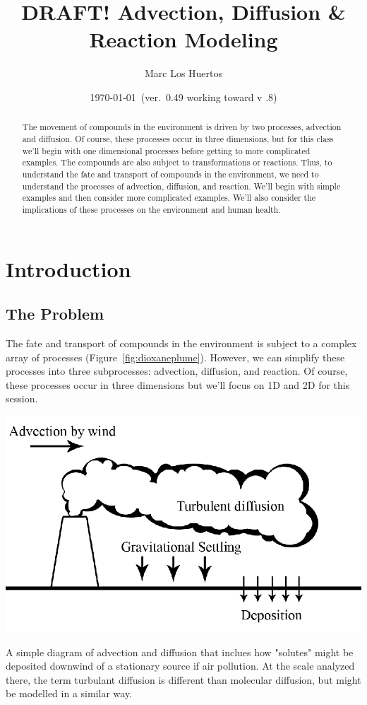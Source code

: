 \documentclass{tufte-handout}\usepackage[]{graphicx}\usepackage[]{xcolor}
\title{DRAFT! Advection, Diffusion \& Reaction Modeling}
\author{Marc Los Huertos}
\date{\today~(ver.~0.49 working toward v .8)}
\begin{document}
\maketitle%
\begin{abstract}
The movement of compounds in the environment is driven by two processes, advection and diffusion. Of course, these processes occur in three dimensions, but for this class we'll begin with one dimensional processes before getting to more complicated examples. The compounds are also subject to transformations or reactions. Thus, to understand the fate and transport of compounds in the environment, we need to understand the processes of advection, diffusion, and reaction. We'll begin with simple examples and then consider more complicated examples. We'll also consider the implications of these processes on the environment and human health.

\end{abstract}

\section{Introduction}

\subsection{The Problem}

The fate and transport of compounds in the environment is subject to a complex array of processes (Figure~\ref{fig:dioxaneplume}). However, we can simplify these processes into three subprocesses: 
advection, diffusion, and reaction. Of course, these processes occur in three dimensions but we'll focus on 1D and 2D for this session. 

\begin{marginfigure}
\centering
\includegraphics[width=1.0\textwidth]{graphics/Diagram-advection-diffusion.png}
\caption{A simple diagram of advection and diffusion that inclues how "solutes" might be deposited downwind of a stationary source if air pollution. At the scale analyzed there, the term turbulant diffusion is different than molecular diffusion, but might be modelled in a similar way.}
\label{fig:advection-diffusion}
\end{marginfigure}
\end{document}
